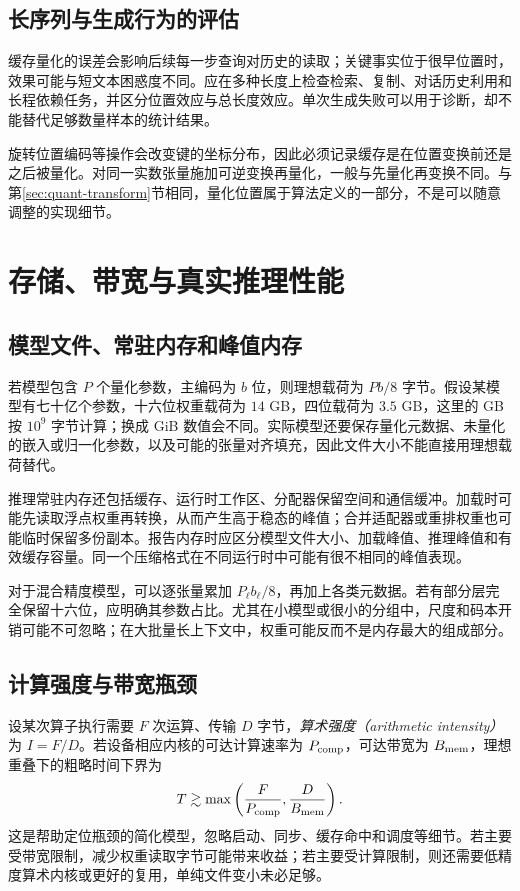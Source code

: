 \documentclass[UTF8,12pt,a4paper,fontset=fandol]{ctexart}
\begin{document}
\subsection{长序列与生成行为的评估}
缓存量化的误差会影响后续每一步查询对历史的读取；关键事实位于很早位置时，效果可能与短文本困惑度不同。应在多种长度上检查检索、复制、对话历史利用和长程依赖任务，并区分位置效应与总长度效应。单次生成失败可以用于诊断，却不能替代足够数量样本的统计结果。

旋转位置编码等操作会改变键的坐标分布，因此必须记录缓存是在位置变换前还是之后被量化。对同一实数张量施加可逆变换再量化，一般与先量化再变换不同。与第\ref{sec:quant-transform}节相同，量化位置属于算法定义的一部分，不是可以随意调整的实现细节。

\section{存储、带宽与真实推理性能}
\label{sec:quant-system}

\subsection{模型文件、常驻内存和峰值内存}
若模型包含 $P$ 个量化参数，主编码为 $b$ 位，则理想载荷为 $Pb/8$ 字节。假设某模型有七十亿个参数，十六位权重载荷为 $14$ GB，四位载荷为 $3.5$ GB，这里的 GB 按 $10^9$ 字节计算；换成 GiB 数值会不同。实际模型还要保存量化元数据、未量化的嵌入或归一化参数，以及可能的张量对齐填充，因此文件大小不能直接用理想载荷替代。

推理常驻内存还包括缓存、运行时工作区、分配器保留空间和通信缓冲。加载时可能先读取浮点权重再转换，从而产生高于稳态的峰值；合并适配器或重排权重也可能临时保留多份副本。报告内存时应区分模型文件大小、加载峰值、推理峰值和有效缓存容量。同一个压缩格式在不同运行时中可能有很不相同的峰值表现。

对于混合精度模型，可以逐张量累加 $P_\ell b_\ell/8$，再加上各类元数据。若有部分层完全保留十六位，应明确其参数占比。尤其在小模型或很小的分组中，尺度和码本开销可能不可忽略；在大批量长上下文中，权重可能反而不是内存最大的组成部分。

\subsection{计算强度与带宽瓶颈}
设某次算子执行需要 $F$ 次运算、传输 $D$ 字节，\emph{算术强度（arithmetic intensity）}为 $I=F/D$。若设备相应内核的可达计算速率为 $P_{\rm comp}$，可达带宽为 $B_{\rm mem}$，理想重叠下的粗略时间下界为
\begin{equation}
 T\gtrsim\max\left(\frac{F}{P_{\rm comp}},\frac{D}{B_{\rm mem}}\right).
 \label{eq:quant-roofline}
\end{equation}
这是帮助定位瓶颈的简化模型，忽略启动、同步、缓存命中和调度等细节。若主要受带宽限制，减少权重读取字节可能带来收益；若主要受计算限制，则还需要低精度算术内核或更好的复用，单纯文件变小未必足够。
\end{document}
